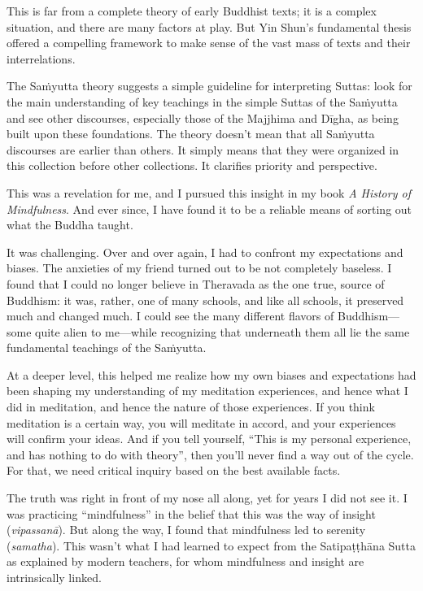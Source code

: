 \documentclass[12pt,openany]{book}%
\begin{document}
This is far from a complete theory of early Buddhist texts; it is a complex situation, and there are many factors at play. But Yin Shun’s fundamental thesis offered a compelling framework to make sense of the vast mass of texts and their interrelations.

The \textsanskrit{Saṁyutta} theory suggests a simple guideline for interpreting Suttas: look for the main understanding of key teachings in the simple Suttas of the \textsanskrit{Saṁyutta} and see other discourses, especially those of the Majjhima and \textsanskrit{Dīgha}, as being built upon these foundations. The theory doesn’t mean that all \textsanskrit{Saṁyutta} discourses are earlier than others. It simply means that they were organized in this collection before other collections. It clarifies priority and perspective.

This was a revelation for me, and I pursued this insight in my book \textit{A History of Mindfulness}. And ever since, I have found it to be a reliable means of sorting out what the Buddha taught.

It was challenging. Over and over again, I had to confront my expectations and biases. The anxieties of my friend turned out to be not completely baseless. I found that I could no longer believe in Theravada as the one true, source of Buddhism: it was, rather, one of many schools, and like all schools, it preserved much and changed much. I could see the many different flavors of Buddhism—some quite alien to me—while recognizing that underneath them all lie the same fundamental teachings of the \textsanskrit{Saṁyutta}.

At a deeper level, this helped me realize how my own biases and expectations had been shaping my understanding of my meditation experiences, and hence what I did in meditation, and hence the nature of those experiences. If you think meditation is a certain way, you will meditate in accord, and your experiences will confirm your ideas. And if you tell yourself, “This is my personal experience, and has nothing to do with theory”, then you’ll never find a way out of the cycle. For that, we need critical inquiry based on the best available facts. 

The truth was right in front of my nose all along, yet for years I did not see it. I was practicing “mindfulness” in the belief that this was the way of insight (\textit{\textsanskrit{vipassanā}}). But along the way, I found that mindfulness led to serenity (\textit{samatha}). This wasn’t what I had learned to expect from the \textsanskrit{Satipaṭṭhāna} Sutta as explained by modern teachers, for whom mindfulness and insight are intrinsically linked. 
\end{document}
